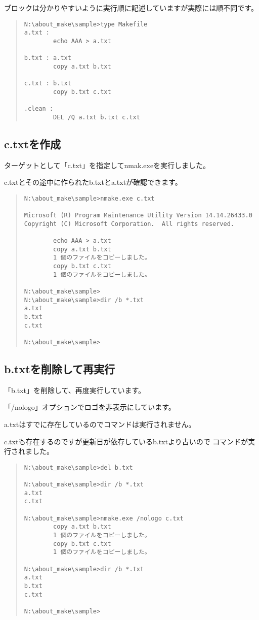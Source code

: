 \documentclass[dvipdfmx]{jsarticle}
\begin{document}
ブロックは分かりやすいように実行順に記述していますが実際には順不同です。

\begin{quote}
\begin{verbatim}
N:\about_make\sample>type Makefile
a.txt :
        echo AAA > a.txt

b.txt : a.txt
        copy a.txt b.txt

c.txt : b.txt
        copy b.txt c.txt

.clean :
        DEL /Q a.txt b.txt c.txt

\end{verbatim}
\end{quote}


\subsection{c.txtを作成}
ターゲットとして「c.txt」を指定してnmak.exeを実行しました。\par
c.txtとその途中に作られたb.txtとa.txtが確認できます。

\begin{quote}
\begin{verbatim}
N:\about_make\sample>nmake.exe c.txt

Microsoft (R) Program Maintenance Utility Version 14.14.26433.0
Copyright (C) Microsoft Corporation.  All rights reserved.

        echo AAA > a.txt
        copy a.txt b.txt
        1 個のファイルをコピーしました。
        copy b.txt c.txt
        1 個のファイルをコピーしました。

N:\about_make\sample>
N:\about_make\sample>dir /b *.txt
a.txt
b.txt
c.txt

N:\about_make\sample>

\end{verbatim}
\end{quote}


\subsection{b.txtを削除して再実行}
「b.txt」を削除して、再度実行しています。\par
「/nologo」オプションでロゴを非表示にしています。\par
a.txtはすでに存在しているのでコマンドは実行されません。\par
c.txtも存在するのですが更新日が依存しているb.txtより古いので
コマンドが実行されました。
\begin{quote}
\begin{verbatim}
N:\about_make\sample>del b.txt

N:\about_make\sample>dir /b *.txt
a.txt
c.txt

N:\about_make\sample>nmake.exe /nologo c.txt
        copy a.txt b.txt
        1 個のファイルをコピーしました。
        copy b.txt c.txt
        1 個のファイルをコピーしました。

N:\about_make\sample>dir /b *.txt
a.txt
b.txt
c.txt

N:\about_make\sample>
\end{verbatim}
\end{quote}
\end{document}
